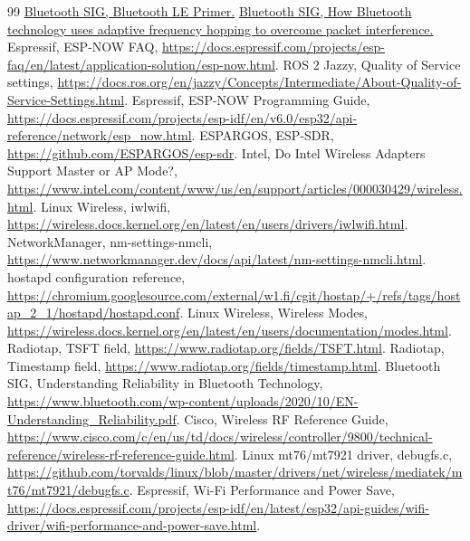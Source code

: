 \documentclass[a4paper,10pt]{ltjsarticle}
\begin{document}
\begin{thebibliography}{99}
 \href{https://www.bluetooth.com/bluetooth-le-primer/}{Bluetooth SIG, Bluetooth LE Primer.}
 \href{https://www.bluetooth.com/blog/how-bluetooth-technology-uses-adaptive-frequency-hopping-to-overcome-packet-interference/}{Bluetooth SIG, How Bluetooth technology uses adaptive frequency hopping to overcome packet interference.}
 Espressif, ESP-NOW FAQ, \url{https://docs.espressif.com/projects/esp-faq/en/latest/application-solution/esp-now.html}.
 ROS 2 Jazzy, Quality of Service settings, \url{https://docs.ros.org/en/jazzy/Concepts/Intermediate/About-Quality-of-Service-Settings.html}.
 Espressif, ESP-NOW Programming Guide, \url{https://docs.espressif.com/projects/esp-idf/en/v6.0/esp32/api-reference/network/esp_now.html}.
 ESPARGOS, ESP-SDR, \url{https://github.com/ESPARGOS/esp-sdr}.
 Intel, Do Intel Wireless Adapters Support Master or AP Mode?, \url{https://www.intel.com/content/www/us/en/support/articles/000030429/wireless.html}.
 Linux Wireless, iwlwifi, \url{https://wireless.docs.kernel.org/en/latest/en/users/drivers/iwlwifi.html}.
 NetworkManager, nm-settings-nmcli, \url{https://www.networkmanager.dev/docs/api/latest/nm-settings-nmcli.html}.
 hostapd configuration reference, \url{https://chromium.googlesource.com/external/w1.fi/cgit/hostap/+/refs/tags/hostap_2_1/hostapd/hostapd.conf}.
 Linux Wireless, Wireless Modes, \url{https://wireless.docs.kernel.org/en/latest/en/users/documentation/modes.html}.
 Radiotap, TSFT field, \url{https://www.radiotap.org/fields/TSFT.html}.
 Radiotap, Timestamp field, \url{https://www.radiotap.org/fields/timestamp.html}.
 Bluetooth SIG, Understanding Reliability in Bluetooth Technology, \url{https://www.bluetooth.com/wp-content/uploads/2020/10/EN-Understanding_Reliability.pdf}.
 Cisco, Wireless RF Reference Guide, \url{https://www.cisco.com/c/en/us/td/docs/wireless/controller/9800/technical-reference/wireless-rf-reference-guide.html}.
 Linux mt76/mt7921 driver, debugfs.c, \url{https://github.com/torvalds/linux/blob/master/drivers/net/wireless/mediatek/mt76/mt7921/debugfs.c}.
 Espressif, Wi-Fi Performance and Power Save, \url{https://docs.espressif.com/projects/esp-idf/en/latest/esp32/api-guides/wifi-driver/wifi-performance-and-power-save.html}.
\end{thebibliography}
\end{document}
